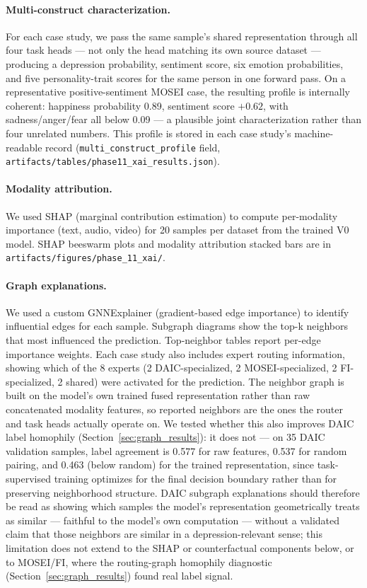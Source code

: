 \documentclass[12pt,oneside]{book}
\begin{document}
\paragraph{Multi-construct characterization.} For each case study, we pass the same sample's shared representation through all four task heads — not only the head matching its own source dataset — producing a depression probability, sentiment score, six emotion probabilities, and five personality-trait scores for the same person in one forward pass. On a representative positive-sentiment MOSEI case, the resulting profile is internally coherent: happiness probability 0.89, sentiment score $+0.62$, with sadness/anger/fear all below 0.09 — a plausible joint characterization rather than four unrelated numbers. This profile is stored in each case study's machine-readable record (\texttt{multi\_construct\_profile} field, \texttt{artifacts/tables/phase11\_xai\_results.json}).

\paragraph{Modality attribution.} We used SHAP (marginal contribution estimation) to compute per-modality importance (text, audio, video) for 20 samples per dataset from the trained V0 model. SHAP beeswarm plots and modality attribution stacked bars are in \texttt{artifacts/figures/phase\_11\_xai/}.

\paragraph{Graph explanations.} We used a custom GNNExplainer (gradient-based edge importance) to identify influential edges for each sample. Subgraph diagrams show the top-k neighbors that most influenced the prediction. Top-neighbor tables report per-edge importance weights. Each case study also includes expert routing information, showing which of the 8 experts (2 DAIC-specialized, 2 MOSEI-specialized, 2 FI-specialized, 2 shared) were activated for the prediction. The neighbor graph is built on the model's own trained fused representation rather than raw concatenated modality features, so reported neighbors are the ones the router and task heads actually operate on. We tested whether this also improves DAIC label homophily (Section~\ref{sec:graph_results}): it does not — on 35 DAIC validation samples, label agreement is 0.577 for raw features, 0.537 for random pairing, and 0.463 (below random) for the trained representation, since task-supervised training optimizes for the final decision boundary rather than for preserving neighborhood structure. DAIC subgraph explanations should therefore be read as showing which samples the model's representation geometrically treats as similar — faithful to the model's own computation — without a validated claim that those neighbors are similar in a depression-relevant sense; this limitation does not extend to the SHAP or counterfactual components below, or to MOSEI/FI, where the routing-graph homophily diagnostic (Section~\ref{sec:graph_results}) found real label signal.
\end{document}
